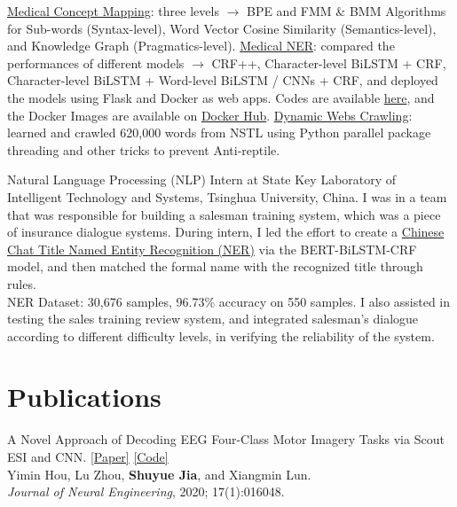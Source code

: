 \documentclass{my_cv}
\begin{document}
\hspace*{\fill} 

\workitemsthree
{\href{https://github.com/SuperBruceJia/Medical-Concept-Mapping}{Medical Concept Mapping}: three levels $\rightarrow$ BPE and FMM \& BMM Algorithms for Sub-words (Syntax-level), Word Vector Cosine Similarity (Semantics-level), and Knowledge Graph (Pragmatics-level).}
{\href{https://github.com/SuperBruceJia/MedicalNER}{Medical NER}: compared the performances of different models $\rightarrow$ CRF++, Character-level BiLSTM + CRF, Character-level BiLSTM + Word-level BiLSTM / CNNs + CRF, and deployed the models using Flask and Docker as web apps. Codes are available \href{https://github.com/SuperBruceJia/pytorch-flask-deploy-webapp}{here}, and the Docker Images are available on \href{https://hub.docker.com/u/shuyuej}{Docker Hub}.}
{\href{https://github.com/SuperBruceJia/dynamic-web-crawlering-python}{Dynamic Webs Crawling}: learned and crawled 620,000 words from NSTL using Python parallel package threading and other tricks to prevent Anti-reptile.}

\hspace*{\fill} 

\workitemsthree
{Natural Language Processing (NLP) Intern at State Key Laboratory of Intelligent Technology and Systems, Tsinghua University, China.}
{I was in a team that was responsible for building a salesman training system, which was a piece of insurance dialogue systems. During intern, I led the effort to create a \href{https://github.com/SuperBruceJia/Chinese-Chat-Title-NER-BERT-BiLSTM-CRF}{Chinese Chat Title Named Entity Recognition (NER)} via the BERT-BiLSTM-CRF model, and then matched the formal name with the recognized title through rules. \\NER Dataset: 30,676 samples, 96.73\% accuracy on 550 samples.}
{I also assisted in testing the sales training review system, and integrated salesman’s dialogue according to different difficulty levels, in verifying the reliability of the system.}

\hspace*{\fill} 

\section{Publications}
\workitemsone
{A Novel Approach of Decoding EEG Four-Class Motor Imagery Tasks via Scout ESI and CNN. \href{https://iopscience.iop.org/article/10.1088/1741-2552/ab4af6/meta}{[Paper]} \href{https://github.com/SuperBruceJia/EEG-Motor-Imagery-Classification-CNNs-TensorFlow}{[Code]}\\
	Yimin Hou, Lu Zhou, \textbf{Shuyue Jia}, and Xiangmin Lun. \\
	\emph{Journal of Neural Engineering}, 2020; 17(1):016048.}
\end{document}
